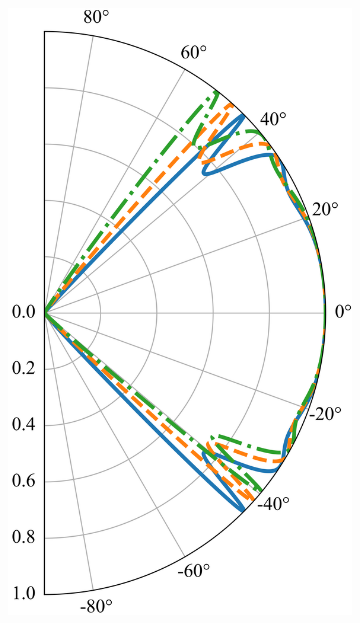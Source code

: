     \begin{figure}[H] %
        \centering
        \begin{subfigure}[b]{0.3\linewidth}
            \includegraphics[width=\linewidth]{fig/tunneling shift/U0.02.png}
            \caption{}
            \label{fig:asym1}
        \end{subfigure}
        \begin{subfigure}[b]{0.3\linewidth}

\end{subfigure}
\end{figure}
